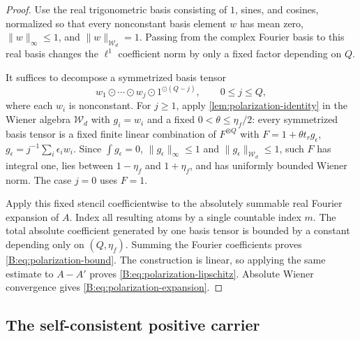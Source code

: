 \documentclass[11pt]{article}
\newcommand{\cW}{\mathcal{W}}
\newcommand{\norm}[1]{\lVert #1\rVert}
\newcommand{\od}{\mathbin{\odot}}
\begin{document}
\begin{proof}
Use the real trigonometric basis consisting of \(1\), sines, and cosines,
normalized so that every nonconstant basis element \(w\) has mean zero,
\(\norm w_\infty\le1\), and \(\norm w_{\cW_d}=1\).  Passing from the
complex Fourier basis to this real basis changes the \(\ell^1\) coefficient
norm by only a fixed factor depending on \(Q\).

It suffices to decompose a symmetrized basis tensor
\[
 w_1\od\cdots\od w_j\od1^{\od(Q-j)},
 \qquad 0\le j\le Q,
\]
where each \(w_i\) is nonconstant.  For \(j\ge1\), apply
\cref{lem:polarization-identity} in the Wiener algebra \(\cW_d\) with
\(g_i=w_i\) and a fixed \(0<\theta\le\eta_f/2\): every symmetrized basis
tensor is a fixed finite linear combination of \(F^{\otimes Q}\) with
\(F=1+\theta t_rg_\epsilon\), \(g_\epsilon=j^{-1}\sum_i\epsilon_iw_i\).  Since
\(\int g_\epsilon=0\), \(\norm{g_\epsilon}_\infty\le1\) and
\(\norm{g_\epsilon}_{\cW_d}\le1\), such \(F\) has integral one, lies between
\(1-\eta_f\) and \(1+\eta_f\), and has uniformly bounded Wiener norm.  The
case \(j=0\) uses \(F=1\).

Apply this fixed stencil coefficientwise to the absolutely summable real
Fourier expansion of \(A\).  Index all resulting atoms by a single
countable index \(m\).  The total absolute coefficient generated by one
basis tensor is bounded by a constant depending only on
\((Q,\eta_f)\).  Summing the Fourier coefficients proves
\eqref{B:eq:polarization-bound}.  The construction is linear, so applying the
same estimate to \(A-A'\) proves \eqref{B:eq:polarization-lipschitz}.  Absolute
Wiener convergence gives \eqref{B:eq:polarization-expansion}.
\end{proof}

\subsection{The self-consistent positive carrier}
\end{document}
